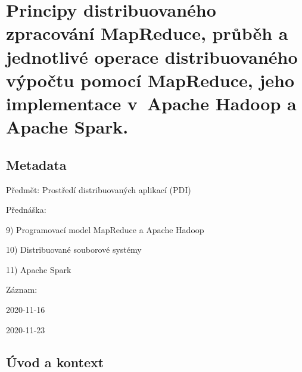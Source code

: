 

\graphicspath{{pdi/map_reduce}}


\chapter{Principy distribuovaného zpracování MapReduce, průběh a jednotlivé operace distribuovaného výpočtu pomocí MapReduce, jeho implementace v~Apache Hadoop a Apache Spark.}


\section{Metadata}

\begin{compactitem}
    \item Předmět: Prostředí distribuovaných aplikací (PDI)
    \item Přednáška:
    \begin{compactitem}
        \item 9) Programovací model MapReduce a Apache Hadoop
        \item 10) Distribuované souborové systémy
        \item 11) Apache Spark
    \end{compactitem}
    \item Záznam:
    \begin{compactitem}
        \item 2020-11-16
        \item 2020-11-23
    \end{compactitem}
\end{compactitem}


\section{Úvod a kontext}

